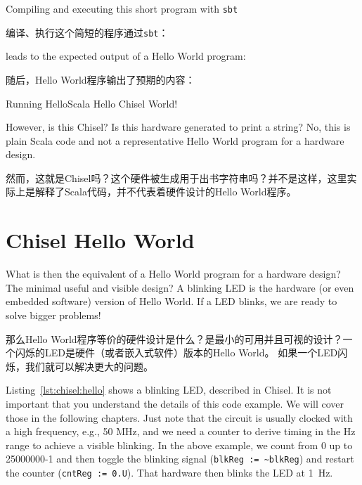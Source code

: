\documentclass[%
    10pt,
    headinclude, footexclude,
    openright, %
    notitlepage,
    cleardoubleempty,
    headsepline,
    pointlessnumbers,
    bibtotoc, idxtotoc,
    ]{scrbook}
\newcommand{\code}[1]{{\small{\texttt{#1}}}}
\begin{document}


\noindent Compiling and executing this short program with \code{sbt}

编译、执行这个简短的程序通过\code{sbt}：


\noindent leads to the expected output of a Hello World program:

随后，Hello World程序输出了预期的内容：

\begin{chisel}
[info] Running HelloScala
Hello Chisel World!
\end{chisel}

\noindent However, is this Chisel? Is this hardware generated to print a string?
No, this is plain Scala code and not a representative Hello World
program for a hardware design.

然而，这就是Chisel吗？这个硬件被生成用于出书字符串吗？并不是这样，这里实际上是解释了Scala代码，并不代表着硬件设计的Hello World程序。


\section{Chisel Hello World}

What is then the equivalent of a Hello World program for a hardware design?
The minimal useful and visible design? A blinking LED is the hardware (or even
embedded software) version of Hello World. If a LED blinks, we are ready to
solve bigger problems!

那么Hello World程序等价的硬件设计是什么？是最小的可用并且可视的设计？一个闪烁的LED是硬件（或者嵌入式软件）版本的Hello World。 
如果一个LED闪烁，我们就可以解决更大的问题。


Listing~\ref{lst:chisel:hello} shows a blinking LED, described in Chisel.
It is not important that you understand the details of this code example.
We will cover those in the following chapters. Just note that the circuit is
usually clocked with a high frequency, e.g., 50 MHz, and we need a counter
to derive timing in the Hz range to achieve a visible blinking. In the above
example, we count from 0 up to 25000000-1 and then toggle the blinking signal
(\code{blkReg := \textasciitilde blkReg}) and restart the counter (\code{cntReg := 0.U}).
That hardware then blinks the LED at 1~Hz.
\end{document}
